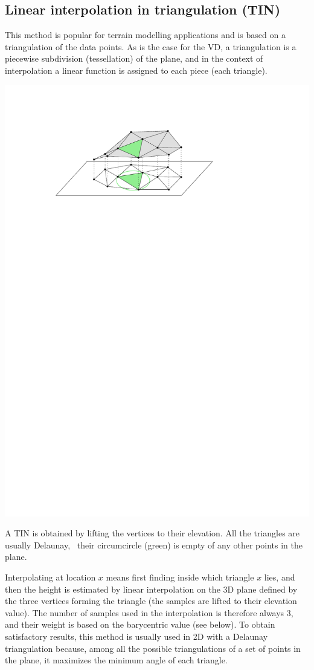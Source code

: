 \subsection{Linear interpolation in triangulation (\textbf{TIN})}%

This method is popular for terrain modelling applications and is based on a triangulation of the data points. 
As is the case for the VD, a triangulation is a piecewise subdivision (tessellation) of the plane, and in the context of interpolation a linear function is assigned to each piece (each triangle). 
\begin{marginfigure}
  \includegraphics{../whatisterrain/figs/tin}
  \caption{A TIN is obtained by lifting the vertices to their elevation. All the triangles are usually Delaunay, \ie\ their circumcircle (green) is empty of any other points in the plane.}%
\label{fig:tin}
\end{marginfigure}
Interpolating at location $x$ means first finding inside which triangle $x$ lies, and then the height is estimated by linear interpolation on the 3D plane defined by the three vertices forming the triangle (the samples are lifted to their elevation value). 
The number of samples used in the interpolation is therefore always 3, and their weight is based on the barycentric value (see below).
To obtain satisfactory results, this method is usually used in 2D with a Delaunay triangulation because, among all the possible triangulations of a set of points in the plane, it maximizes the minimum angle of each triangle. 


